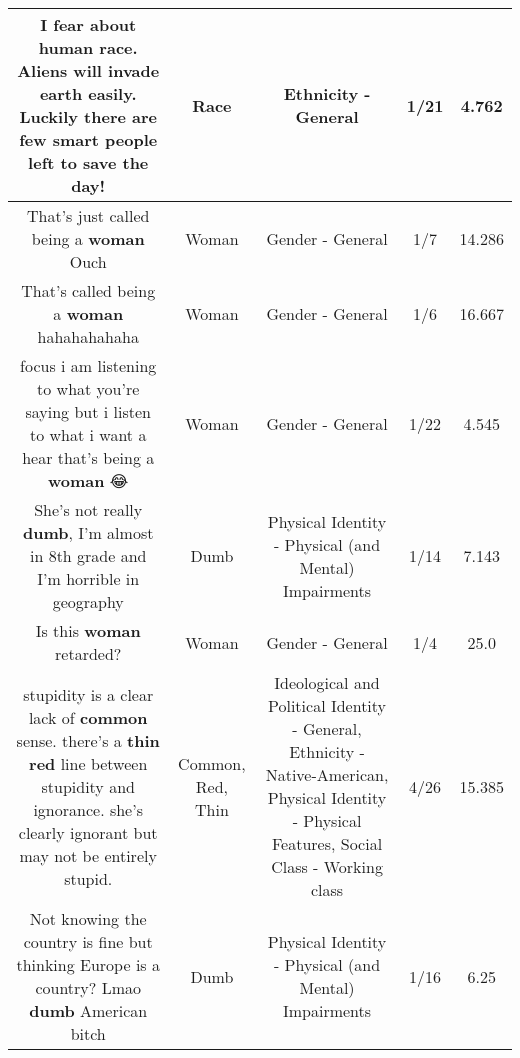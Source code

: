 \documentclass[11pt]{article}
\newlength\mylength
\begin{document}
\begin{center}
\begin{longtable}{|C{.65\mylength}|C{.30\mylength}|C{.12\mylength}|C{.12\mylength}|C{.12\mylength}|}
  \small I fear about human \textbf{race}. Aliens will invade earth easily. Luckily there are few smart people left to save the day!\normalsize   & Race & Ethnicity - General & 1/21 & 4.762 \\  \hline
  \small That's just called being a \textbf{woman} Ouch\normalsize   & Woman & Gender - General & 1/7 & 14.286 \\  \hline
  \small That's called being a \textbf{woman} hahahahahaha\normalsize   & Woman & Gender - General & 1/6 & 16.667 \\  \hline
  \small focus i am listening to what you're saying but i listen to what i want a hear that's being a \textbf{woman} 😂\normalsize   & Woman & Gender - General & 1/22 & 4.545 \\  \hline
  \small She's not really \textbf{dumb}, I'm almost in 8th grade and I'm horrible in geography\normalsize   & Dumb & Physical Identity - Physical (and Mental) Impairments & 1/14 & 7.143 \\  \hline
  \small Is this \textbf{woman} retarded?\normalsize   & Woman & Gender - General & 1/4 & 25.0 \\  \hline
  \small stupidity is a clear lack of \textbf{common} sense.  there's a \textbf{thin} \textbf{r\textbf{ed}} line between stupidity and ignorance.  she's clearly ignorant but may not be entirely stupid.\normalsize   & Common, Red, Thin &  Ideological and Political Identity - General, Ethnicity - Native-American, Physical Identity - Physical Features, Social Class - Working class & 4/26 & 15.385 \\  \hline
  \small Not knowing the country is fine but thinking Europe is a country? Lmao \textbf{dumb} American bitch\normalsize   & Dumb & Physical Identity - Physical (and Mental) Impairments & 1/16 & 6.25 \\  \hline

\end{longtable}
\end{center}
\end{document}
